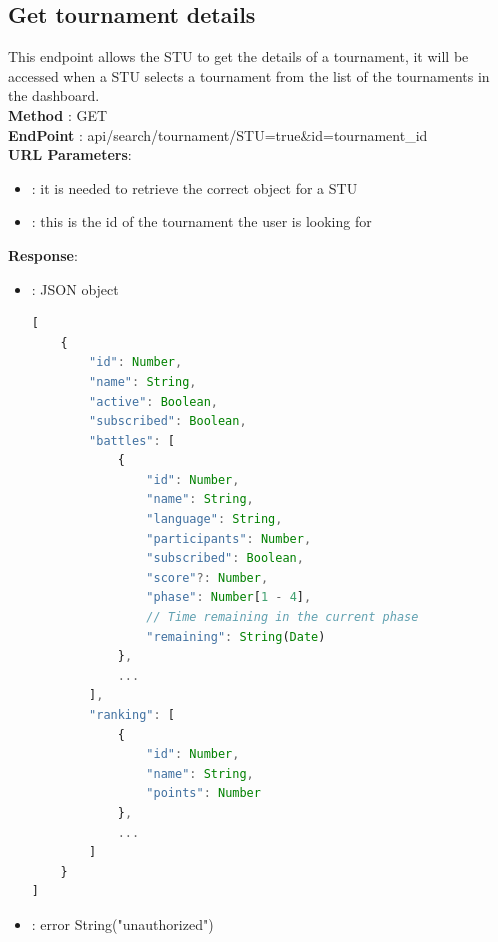 \subsection*{Get tournament details}
This endpoint allows the STU to get the details of a tournament, it will be accessed when a STU selects a tournament from the list of the tournaments in the dashboard.\\
\textbf{Method} : GET \\
\textbf{EndPoint} : api/search/tournament/STU=true\&id=tournament\_id\\
\textbf{URL Parameters}:
        \begin{itemize}
            \item {} : it is needed to retrieve the correct object for a STU
            \item {} : this is the id of the tournament the user is looking for
        \end{itemize}
\textbf{Response}:
        \begin{itemize}
            \item {} : JSON object
            \begin{lstlisting}[language=JavaScript, label={lst:jscode}, basicstyle=\ttfamily]
[
    {
        "id": Number,
        "name": String,
        "active": Boolean,
        "subscribed": Boolean,
        "battles": [
            {
                "id": Number,
                "name": String,
                "language": String,
                "participants": Number,
                "subscribed": Boolean,
                "score"?: Number,
                "phase": Number[1 - 4],
                // Time remaining in the current phase
                "remaining": String(Date)
            },
            ...
        ],
        "ranking": [
            {
                "id": Number,
                "name": String,
                "points": Number
            },
            ...
        ]
    }
]
            \end{lstlisting}
            \item {} : error String("unauthorized")
        \end{itemize}


